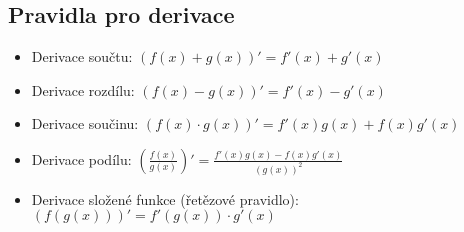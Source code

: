 \subsection{Pravidla pro derivace} 

\begin{itemize}
  \item Derivace součtu: \quad \( (f(x) + g(x))' = f'(x) + g'(x) \)
  \item Derivace rozdílu: \quad \( (f(x) - g(x))' = f'(x) - g'(x) \)
  \item Derivace součinu: \quad \( (f(x) \cdot g(x))' = f'(x)g(x) + f(x)g'(x) \)
  \item Derivace podílu: \quad \( \left( \frac{f(x)}{g(x)} \right)' = \frac{f'(x)g(x) - f(x)g'(x)}{(g(x))^2} \)
  \item Derivace složené funkce (řetězové pravidlo): \quad \( (f(g(x)))' = f'(g(x)) \cdot g'(x) \)
\end{itemize}

